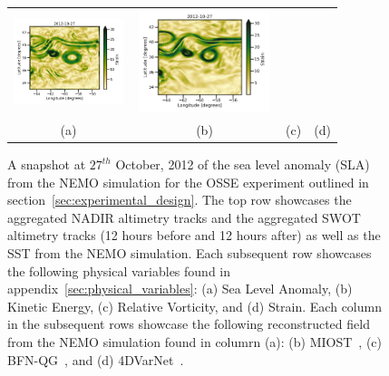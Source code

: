 \begin{figure}[t!]
\begin{center}
\begin{tabular}{cccc}
\includegraphics[trim={0 0 38mm 0},clip, width=3.2cm,height=3cm]{content/figures/maps/strain/dc20a/nadir4/dc20a_bfnqg_strain.png} &
\includegraphics[width=4.0cm,height=3cm]{content/figures/maps/strain/dc20a/nadir4/dc20a_4dvarnet_strain.png}  \\
(a) & (b) & (c) & (d)
\end{tabular}
\vspace{-3mm}
\caption{
A snapshot at $27^{th}$ October, 2012 of the sea level anomaly (SLA) from the NEMO simulation for the OSSE experiment outlined in section~\ref{sec:experimental_design}. 
The top row showcases the aggregated NADIR altimetry tracks and the aggregated SWOT altimetry tracks (12 hours before and 12 hours after) as well as the SST from the NEMO simulation.
Each subsequent row showcases the following physical variables found in appendix~\ref{sec:physical_variables}: (a) Sea Level Anomaly, (b) Kinetic Energy, (c) Relative Vorticity, and (d) Strain. 
Each column in the subsequent rows showcase the following reconstructed field from the NEMO simulation found in columrn (a): (b) MIOST~\cite{MIOST}, (c) BFN-QG~\cite{BFNQG}, and (d) 4DVarNet~\cite{4DVARNETSWOT}.}
\vspace{-5mm}
\label{fig:oceanbench_maps}
\end{center}
\end{figure}



